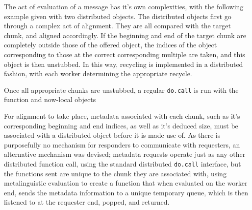 \documentclass[a4paper,10pt]{article}
\begin{document}
The act of evaluation of a message has it's own complexities, with the following example given with two distributed objects.
The distributed objects first go through a complex act of alignment.
They are all compared with the target chunk, and aligned accordingly.
If the beginning and end of the target chunk are completely outside those of the offered object, the indices of the object corresponding to those at the correct corresponding multiple are taken, and this object is then unstubbed.
In this way, recycling is implemented in a distributed fashion, with each worker determining the appropriate recycle.

Once all appropriate chunks are unstubbed, a regular \texttt{do.call} is run with the function and now-local objects

For alignment to take place, metadata associated with each chunk, such as it's corresponding beginning and end indices, as well as it's deduced size, must be associated with a distributed object before it is made use of.
As there is purposefully no mechanism for responders to communicate with requesters, an alternative mechanism was devised; metadata requests operate just as any other distributed function call, using the standard distributed \texttt{do.call} interface, but the functions sent are unique to the chunk they are associated with, using metalinguistic evaluation to create a function that when evaluated on the worker end, sends the metadata information to a unique temporary queue, which is then listened to at the requester end, popped, and returned.

\printbibliography
\end{document}

